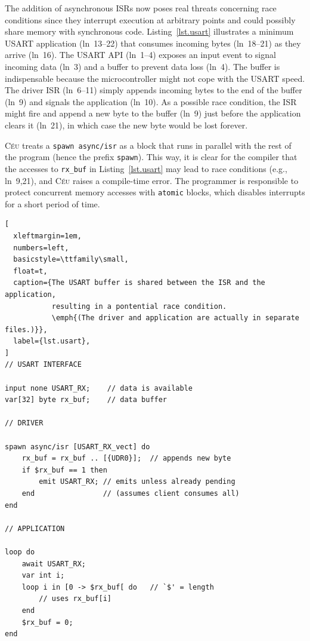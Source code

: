 \documentclass[sigplan,10pt,review,anonymous]{acmart}\settopmatter{printfolios=true,printccs=false,printacmref=false}
\newcommand{\CEU}{\textsc{C\'{e}u}\xspace}
\newcommand{\code}[1] {{\small{\texttt{#1}}}}
\begin{document}
The addition of asynchronous ISRs now poses real threats concerning race
conditions since they interrupt execution at arbitrary points and could
possibly share memory with synchronous code.
%
Listing~\ref{lst.usart} illustrates a minimum USART application (ln~13--22)
that consumes incoming bytes (ln~18--21) as they arrive (ln~16).
%
The USART API (ln~1--4) exposes an input event to signal incoming data (ln~3)
and a buffer to prevent data loss (ln~4).
The buffer is indispensable because the microcontroller might not cope with the
USART speed.
%
The driver ISR (ln~6--11) simply appends incoming bytes to the end of the
buffer (ln~9) and signals the application (ln~10).
%
As a possible race condition, the ISR might fire and append a new byte to the
buffer (ln~9) just before the application clears it (ln~21), in which case the
new byte would be lost forever.

\CEU treats a \code{spawn~async/isr} as a block that runs in parallel with the
rest of the program (hence the prefix \code{spawn}).
%
This way, it is clear for the compiler that the accesses to \code{rx\_buf} in
Listing~\ref{lst.usart} may lead to race conditions (e.g., ln~9,21), and \CEU
raises a compile-time error.
%
The programmer is responsible to protect concurrent memory accesses with
\code{atomic} blocks, which disables interrupts for a short period
of time.

\begin{lstlisting}[
  xleftmargin=1em,
  numbers=left,
  basicstyle=\ttfamily\small,
  float=t,
  caption={The USART buffer is shared between the ISR and the application,
           resulting in a pontential race condition.
           \emph{(The driver and application are actually in separate files.)}},
  label={lst.usart},
]
// USART INTERFACE

input none USART_RX;    // data is available
var[32] byte rx_buf;    // data buffer

// DRIVER

spawn async/isr [USART_RX_vect] do
    rx_buf = rx_buf .. [{UDR0}];  // appends new byte
    if $rx_buf == 1 then
        emit USART_RX; // emits unless already pending
    end                // (assumes client consumes all)
end

// APPLICATION

loop do
    await USART_RX;
    var int i;
    loop i in [0 -> $rx_buf[ do   // `$' = length
        // uses rx_buf[i]
    end
    $rx_buf = 0;
end
\end{lstlisting}
\end{document}
